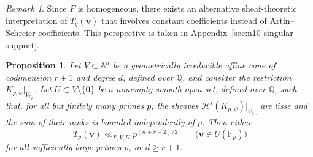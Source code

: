 \documentclass[a4paper,11pt, twoside,reqno]{amsart}
\theoremstyle{plain}
\newtheorem{prop}[thm]{Proposition}
\theoremstyle{definition}
\theoremstyle{remark}
\newtheorem{rem}[thm]{Remark}
\newcommand{\bfv}{\bm{v}}
\newcommand{\QQ}{\mathbb{Q}}
\renewcommand{\ge}{\geqslant}
\newcommand{\FF}{\mathbb{F}}
\numberwithin{equation}{section}
\begin{document}
\begin{rem}
Since $F$ is homogeneous,
there exists an alternative sheaf-theoretic interpretation of $T_q(\bfv)$
that involves constant coefficients instead of Artin--Schreier coefficients. This perspective is taken in Appendix~\ref{sec:n10-singular-support}. 
\end{rem}

\begin{prop}
\label{n10:moment-trace}
    Let $V\subset\mathbb{A}^{n}$ be a geometrically irreducible
    affine cone of codimension $r+1$ and degree $d$, defined
    over $\QQ$, and consider the restriction
    $K_{p,\psi}|_{V_{\FF_p}}$.
    Let $U\subset V\setminus\{\bm0\}$ be a nonempty smooth
    open set, defined over $\QQ$, such that, for all but
    finitely many primes $p$, the sheaves
    $\mathcal H^i(K_{p,\psi})|_{U_{\FF_p}}$ are lisse and
    the sum of their ranks is bounded independently of $p$.
    Then either
    \[
        T_p(\bfv)\ll_{F,V,U}p^{(n+r-2)/2}
        \qquad
        \bigl(\bfv\in U(\FF_p)\bigr)
    \]
    for all sufficiently large primes $p$, or $d\ge r+1$.
\end{prop}
\end{document}

